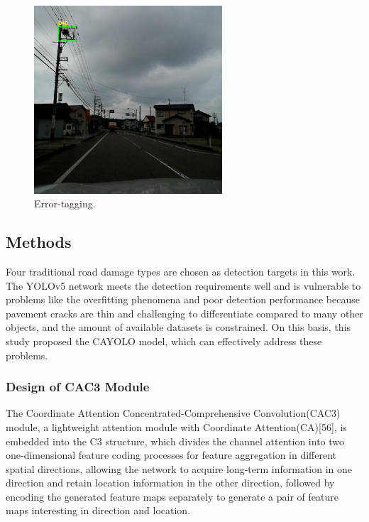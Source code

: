 \documentclass[sensors,article,submit,moreauthors]{Definitions/mdpi}
\begin{document}
    \begin{figure}[H]
        \includegraphics[width=7cm]{images/figure2}
        \caption{Error-tagging.\label{fig:2}}
    \end{figure}

    \subsection{Methods}

    Four traditional road damage types are chosen as detection targets in this work. The YOLOv5 network meets the detection requirements well and is vulnerable to problems like the overfitting phenomena and poor detection performance because pavement cracks are thin and challenging to differentiate compared to many other objects, and the amount of available datasets is constrained. On this basis, this study proposed the CAYOLO model, which can effectively address these problems.

    \subsubsection{Design of CAC3 Module}

    The Coordinate Attention Concentrated-Comprehensive Convolution(CAC3) module, a lightweight attention module with Coordinate Attention(CA)[56]\citep{Hou_2021_CVPR}, is embedded into the C3 structure, which divides the channel attention into two one-dimensional feature coding processes for feature aggregation in different spatial directions, allowing the network to acquire long-term information in one direction and retain location information in the other direction, followed by encoding the generated feature maps separately to generate a pair of feature maps interesting in direction and location.
\end{document}
